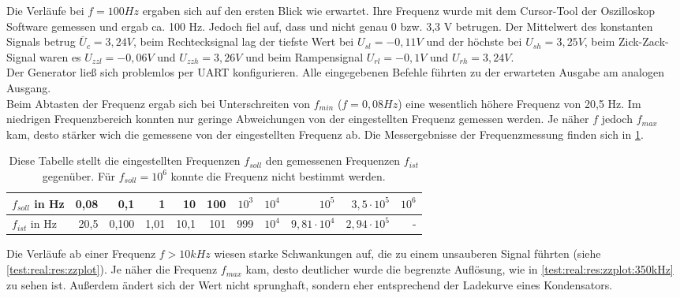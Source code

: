 Die Verläufe bei $f = 100Hz$ ergaben sich auf den ersten Blick wie erwartet.
Ihre Frequenz wurde mit dem Cursor-Tool der Oszilloskop Software gemessen und ergab ca. 100 Hz.
Jedoch fiel auf, dass  und  nicht genau 0 bzw. 3,3 V betrugen.
Der Mittelwert des konstanten Signals betrug $\overline{U}_{c}=3,24 V$, beim Rechtecksignal lag der tiefste Wert bei $U_{sl} = -0,11 V$ und der höchste bei $U_{sh} = 3,25 V$, beim Zick-Zack-Signal waren es $U_{zzl} = -0,06 V$ und $U_{zzh} = 3,26 V$ und beim Rampensignal $U_{rl} = -0,1 V$ und $U_{rh} = 3,24 V$. \\
Der Generator ließ sich problemlos per UART konfigurieren.
Alle eingegebenen Befehle führten zu der erwarteten Ausgabe am analogen Ausgang.\\
Beim Abtasten der Frequenz  ergab sich bei Unterschreiten von $f_{min}$ ($f = 0,08Hz$) eine wesentlich höhere Frequenz von 20,5 Hz. 
Im niedrigen Frequenzbereich konnten nur geringe Abweichungen von der eingestellten Frequenz gemessen werden.
Je näher $f$ jedoch $f_{max}$ kam, desto stärker wich die gemessene von der eingestellten Frequenz ab.
Die Messergebnisse der Frequenzmessung finden sich in \cref{test:real:res:ftab}.

\begin{table}[h]
  \begin{tabular}[h]{|l|r|r|r|r|r|r|r|r|r|r|}
    \hline
    $f_{soll}$ in Hz & 0,08 & 0,1 & 1 & 10 & 100 & $10^3$ & $10^4$ & $10^5$ & $3,5 \cdot 10^5$ & $10^6$\\ \hline
    $f_{ist}$ in Hz & 20,5 & 0,100 & 1,01& 10,1 & 101 & 999 & $10^4$ & $9,81 \cdot 10^4$ & $2,94 \cdot 10^5$ & - \\ \hline
  \end{tabular}
  \caption{Diese Tabelle stellt die eingestellten Frequenzen $f_{soll}$ den gemessenen Frequenzen $f_{ist}$ gegenüber. Für $f_{soll} = 10^6$ konnte die Frequenz nicht bestimmt werden.} \label{test:real:res:ftab}
\end{table}

Die Verläufe ab einer Frequenz $f > 10 kHz$ wiesen starke Schwankungen auf, die zu einem unsauberen Signal führten (siehe \cref{test:real:res:zzplot}).
Je näher die Frequenz $f_{max}$ kam, desto deutlicher wurde die begrenzte Auflösung, wie in \cref{test:real:res:zzplot:350kHz} zu sehen ist.
Außerdem ändert sich der Wert nicht sprunghaft, sondern eher entsprechend der Ladekurve eines Kondensators.


